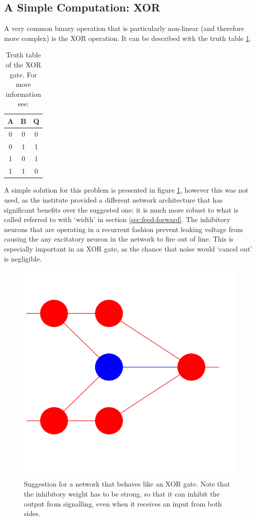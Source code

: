 \documentclass[a4paper,twocolumn]{article}
\begin{document}
\subsection{A Simple Computation: XOR}
A very common binary operation that is particularly non-linear (and therefore
more complex) is the XOR operation. It can be described with the truth table
\ref{tab:XOR}.
\begin{table}
    \centering
    \begin{tabular}{c | c | c}
        A & B & Q \\ \hline
        0 & 0 & 0 \\
        0 & 1 & 1 \\
        1 & 0 & 1 \\
        1 & 1 & 0
    \end{tabular}
    \caption{Truth table of the XOR gate. For more information see:
    \cite{horowitz_hill_2020}}
    \label{tab:XOR}
\end{table}
A simple solution for this problem is presented in figure
\ref{fig:XOR-suggested}, however this was not used, as the institute provided a
different network architecture that has significant benefits over the suggested
one: it is much more robust to what is called referred to with `width' in
section \ref{sec:feed-forward}. The inhibitory neurons that are operating in a
recurrent fashion prevent leaking voltage from causing the any excitatory neuron
in the network to fire out of line. This is especially important in an XOR gate,
as the chance that noise would `cancel out' is negligible.

\begin{figure}
    \centering
    \includegraphics[width=.5\textwidth]{figures/XOR-suggestion.png}
    \caption{Suggestion for a network that behaves like an XOR gate. Note that
        the inhibitory weight has to be strong, so that it can inhibit the output
        from signalling, even when it receives an input from both sides.}
    \label{fig:XOR-suggested}
\end{figure}
\end{document}
